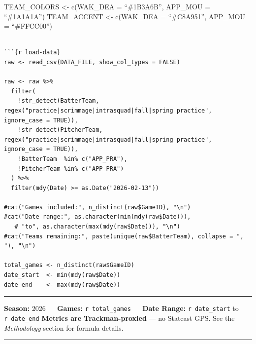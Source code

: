 \documentclass[
]{article}
\begin{document}
TEAM\_COLORS \textless- c(WAK\_DEA = ``\#1B3A6B'', APP\_MOU =
``\#1A1A1A'') TEAM\_ACCENT \textless- c(WAK\_DEA = ``\#C8A951'',
APP\_MOU = ``\#FFCC00'')

\begin{verbatim}

```{r load-data}
raw <- read_csv(DATA_FILE, show_col_types = FALSE)

raw <- raw %>%
  filter(
    !str_detect(BatterTeam,  regex("practice|scrimmage|intrasquad|fall|spring practice", ignore_case = TRUE)),
    !str_detect(PitcherTeam, regex("practice|scrimmage|intrasquad|fall|spring practice", ignore_case = TRUE)),
    !BatterTeam  %in% c("APP_PRA"),
    !PitcherTeam %in% c("APP_PRA")
  ) %>%
  filter(mdy(Date) >= as.Date("2026-02-13"))

#cat("Games included:", n_distinct(raw$GameID), "\n")
#cat("Date range:", as.character(min(mdy(raw$Date))),
   # "to", as.character(max(mdy(raw$Date))), "\n")
#cat("Teams remaining:", paste(unique(raw$BatterTeam), collapse = ", "), "\n")

total_games <- n_distinct(raw$GameID)
date_start  <- min(mdy(raw$Date))
date_end    <- max(mdy(raw$Date))
\end{verbatim}

\begin{center}\rule{0.5\linewidth}{0.5pt}\end{center}

\textbf{Season:} 2026 ~\textbar~ \textbf{Games:}
\texttt{r\ total\_games} ~\textbar~ \textbf{Date Range:}
\texttt{r\ date\_start} to \texttt{r\ date\_end} \textbf{Metrics are
Trackman-proxied} --- no Statcast GPS. See the \emph{Methodology}
section for formula details.

\begin{center}\rule{0.5\linewidth}{0.5pt}\end{center}
\end{document}
